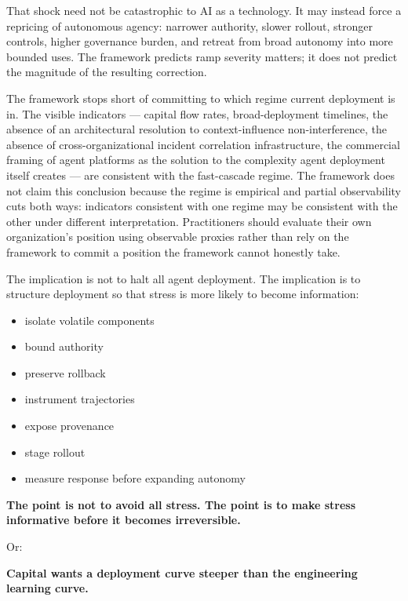\documentclass[11pt]{article}
\begin{document}
That shock need not be catastrophic to AI as a technology. It may instead force a repricing of autonomous agency: narrower authority, slower rollout, stronger controls, higher governance burden, and retreat from broad autonomy into more bounded uses. The framework predicts ramp severity matters; it does not predict the magnitude of the resulting correction.

The framework stops short of committing to which regime current deployment is in. The visible indicators --- capital flow rates, broad-deployment timelines, the absence of an architectural resolution to context-influence non-interference, the absence of cross-organizational incident correlation infrastructure, the commercial framing of agent platforms as the solution to the complexity agent deployment itself creates --- are consistent with the fast-cascade regime. The framework does not claim this conclusion because the regime is empirical and partial observability cuts both ways: indicators consistent with one regime may be consistent with the other under different interpretation. Practitioners should evaluate their own organization's position using observable proxies rather than rely on the framework to commit a position the framework cannot honestly take.

The implication is not to halt all agent deployment. The implication is to structure deployment so that stress is more likely to become information:
\begin{itemize}
\item isolate volatile components
\item bound authority
\item preserve rollback
\item instrument trajectories
\item expose provenance
\item stage rollout
\item measure response before expanding autonomy
\end{itemize}

\begin{pullquote}
\textbf{The point is not to avoid all stress. The point is to make stress informative before it becomes irreversible.}
\end{pullquote}

Or:

\begin{pullquote}
\textbf{Capital wants a deployment curve steeper than the engineering learning curve.}
\end{pullquote}
\end{document}
